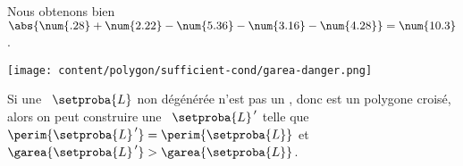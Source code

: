 Nous obtenons bien $\abs{\num{.28} + \num{2.22} - \num{5.36} - \num{3.16} - \num{4.28}} = \num{10.3}$.






\begin{center}
    \texttt{[image: content/polygon/sufficient-cond/garea-danger.png]}
\end{center}












\begin{fact} \label{no-cross-max}
    Si une \nline\ $\setproba{L}$ non dégénérée n'est pas un \ngone, donc est un polygone croisé, alors on peut construire une \nline\ $\setproba{L}^{\,\prime}$ telle que 
	$\perim{\setproba{L}^{\,\prime}} = \perim{\setproba{L}}$ 
	et 
	$\garea{\setproba{L}^{\,\prime}} > \garea{\setproba{L}}$.
\end{fact}


